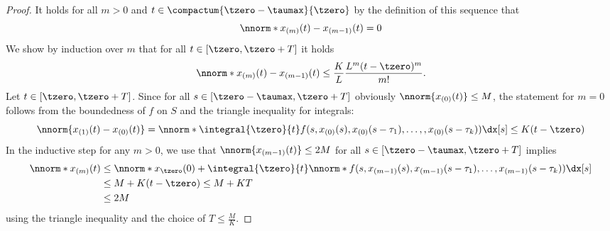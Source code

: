 \begin{proof}
        It holds for all $m>0$ and $t\in \compactum{\tzero-\taumax}{\tzero}$ by the definition of this sequence that
        \begin{equation*}
            \nnorm*{x_{(m)}(t)-x_{(m-1)}(t)}=0
        \end{equation*}
        We show by induction over $m$ that for all $t\in [\tzero,\tzero+T]$ it holds
        \begin{equation*}
            \nnorm*{x_{(m)}(t)-x_{(m-1)}(t)} \leq \frac{K}{L}\frac{L^m (t-\tzero)^m}{m!}.
        \end{equation*}
        Let $t\in [\tzero,\tzero+T]$. Since for all $s\in [\tzero-\taumax,\tzero+T]$ obviously $\nnorm{x_{(0)}(t)}\leq M$, the statement for $m=0$ follows from the boundedness of $f$ on $S$ and the triangle inequality for integrals:
        \begin{equation*}
            \nnorm{x_{(1)}(t)-x_{(0)}(t)} = \nnorm*{\integral{\tzero}{t} f(s,x_{(0)}(s),x_{(0)}(s-\tau_1),\ldots,,x_{(0)}(s-\tau_k))\dx[s]} \leq K(t-\tzero)
        \end{equation*}
        In the inductive step for any $m>0$, we use that $\nnorm{x_{(m-1)}(t)}\leq 2M$ for all $s\in [\tzero-\taumax,\tzero+T]$ implies
        \begin{align}\label{eq:bounded-xm}
            \nnorm*{x_{(m)}(t)} &\leq \nnorm*{x_\tzero(0)} + \integral{\tzero}{t} \nnorm*{f(s,x_{(m-1)}(s),x_{(m-1)}(s-\tau_1),\ldots,x_{(m-1)}(s-\tau_k))}\dx[s] \nonumber \\
            &\leq M + K(t-\tzero) \leq M+KT \nonumber \\
            &\leq 2M
        \end{align}
        using the triangle inequality and the choice of $T\leq\frac{M}{K}$.


\end{proof}
